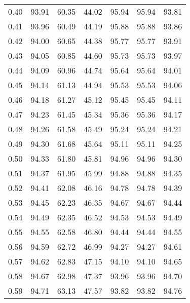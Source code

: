 \begin{tabular}{|c|c|c|c|c|c|c|}
      0.40 &     93.91 &     60.35 &      44.02 &   95.94 &      95.94 &         93.81 \\
      0.41 &     93.96 &     60.49 &      44.19 &   95.88 &      95.88 &         93.86 \\
      0.42 &     94.00 &     60.65 &      44.38 &   95.77 &      95.77 &         93.91 \\
      0.43 &     94.05 &     60.85 &      44.60 &   95.73 &      95.73 &         93.97 \\
      0.44 &     94.09 &     60.96 &      44.74 &   95.64 &      95.64 &         94.01 \\
      0.45 &     94.14 &     61.13 &      44.94 &   95.53 &      95.53 &         94.06 \\
      0.46 &     94.18 &     61.27 &      45.12 &   95.45 &      95.45 &         94.11 \\
      0.47 &     94.23 &     61.45 &      45.34 &   95.36 &      95.36 &         94.17 \\
      0.48 &     94.26 &     61.58 &      45.49 &   95.24 &      95.24 &         94.21 \\
      0.49 &     94.30 &     61.68 &      45.64 &   95.11 &      95.11 &         94.25 \\
      0.50 &     94.33 &     61.80 &      45.81 &   94.96 &      94.96 &         94.30 \\
      0.51 &     94.37 &     61.95 &      45.99 &   94.88 &      94.88 &         94.35 \\
      0.52 &     94.41 &     62.08 &      46.16 &   94.78 &      94.78 &         94.39 \\
      0.53 &     94.45 &     62.23 &      46.35 &   94.67 &      94.67 &         94.44 \\
      0.54 &     94.49 &     62.35 &      46.52 &   94.53 &      94.53 &         94.49 \\
      0.55 &     94.55 &     62.58 &      46.80 &   94.44 &      94.44 &         94.55 \\
      0.56 &     94.59 &     62.72 &      46.99 &   94.27 &      94.27 &         94.61 \\
      0.57 &     94.62 &     62.83 &      47.15 &   94.10 &      94.10 &         94.65 \\
      0.58 &     94.67 &     62.98 &      47.37 &   93.96 &      93.96 &         94.70 \\
      0.59 &     94.71 &     63.13 &      47.57 &   93.82 &      93.82 &         94.76 \\

\end{tabular}
